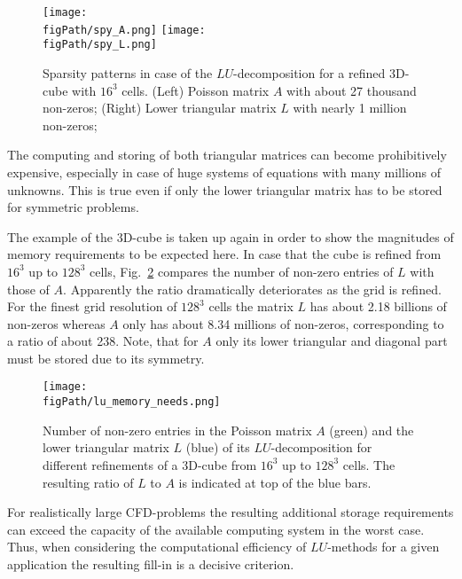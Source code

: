 \begin{figure}[ht]
\begin{center}
\texttt{[image: \\figPath/spy\_A.png]}\qquad\qquad\qquad
\texttt{[image: \\figPath/spy\_L.png]}\\
\end{center}
\caption[Sparsity patterns in case of a $LU$-decomposition for a refined 3D-cube with $16^3$ cells]{
Sparsity patterns in case of the $LU$-decomposition for a refined 3D-cube with $16^3$ cells.
(Left) Poisson matrix $A$ with about 27 thousand non-zeros; (Right) Lower triangular matrix $L$ with nearly 1 million non-zeros;
}
\label{FIG_SCARC_lu_memory_spy}
\end{figure}

\newpage
The computing and storing of both triangular matrices can become prohibitively expensive, especially in case of huge systems of equations with many  millions of unknowns. This is true even if only the lower triangular matrix has to be stored for symmetric problems.

The example of the 3D-cube is taken up again in order to show the magnitudes of memory requirements to be expected here.
In case that the cube is refined from $16^3$ up to $128^3$ cells, Fig.~\ref{FIG_SCARC_lu_memory_need} compares
the number of non-zero entries of $L$ with those of $A$. Apparently the ratio dramatically deteriorates as the grid is refined. 
For the finest grid resolution of $128^3$ cells the matrix $L$ has about 2.18 billions %
of non-zeros whereas $A$ only has about 8.34 millions of non-zeros, %
corresponding to a ratio of about 238. Note, that for $A$ only its lower triangular and diagonal part must be stored due to its symmetry.

\begin{figure}[ht]
\centering\texttt{[image: \\figPath/lu\_memory\_needs.png]}\\[2ex]
\caption[Memory needs for the $LU$-decomposition]{
Number of non-zero entries in the Poisson matrix $A$ (green) and the lower triangular matrix $L$ (blue) of its $LU$-decomposition for different refinements of a 3D-cube from $16^3$ up to $128^3$ cells. The resulting ratio of $L$ to  $A$ is indicated at top of the blue bars. 
}
\label{FIG_SCARC_lu_memory_need}
\end{figure}

For realistically large CFD-problems the resulting additional storage requirements can  exceed the capacity of the available computing system in the worst case.
Thus, when considering the computational efficiency of $LU$-methods for a given application the resulting fill-in is a decisive criterion. 


